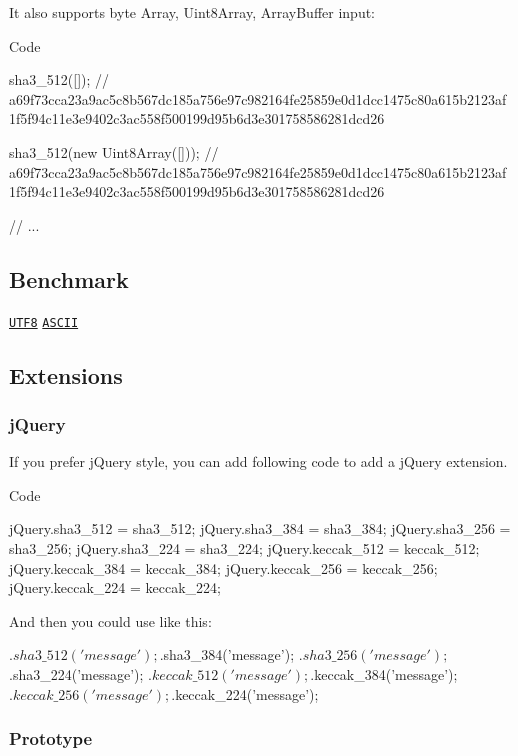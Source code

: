 It also supports byte {\ttfamily Array}, {\ttfamily Uint8\+Array}, {\ttfamily Array\+Buffer} input\+:

Code 
\begin{DoxyCode}
sha3\_512([]);
//
       a69f73cca23a9ac5c8b567dc185a756e97c982164fe25859e0d1dcc1475c80a615b2123af1f5f94c11e3e9402c3ac558f500199d95b6d3e301758586281dcd26

sha3\_512(new Uint8Array([]));
//
       a69f73cca23a9ac5c8b567dc185a756e97c982164fe25859e0d1dcc1475c80a615b2123af1f5f94c11e3e9402c3ac558f500199d95b6d3e301758586281dcd26

// ...
\end{DoxyCode}


\subsection*{Benchmark}

\href{http://jsperf.com/sha3/5}{\tt U\+T\+F8} \href{http://jsperf.com/sha3/4}{\tt A\+S\+C\+II}

\subsection*{Extensions}

\subsubsection*{j\+Query}

If you prefer j\+Query style, you can add following code to add a j\+Query extension.

Code 
\begin{DoxyCode}
jQuery.sha3\_512 = sha3\_512;
jQuery.sha3\_384 = sha3\_384;
jQuery.sha3\_256 = sha3\_256;
jQuery.sha3\_224 = sha3\_224;
jQuery.keccak\_512 = keccak\_512;
jQuery.keccak\_384 = keccak\_384;
jQuery.keccak\_256 = keccak\_256;
jQuery.keccak\_224 = keccak\_224;
\end{DoxyCode}
 And then you could use like this\+: 
\begin{DoxyCode}
$.sha3\_512('message');
$.sha3\_384('message');
$.sha3\_256('message');
$.sha3\_224('message');
$.keccak\_512('message');
$.keccak\_384('message');
$.keccak\_256('message');
$.keccak\_224('message');
\end{DoxyCode}
 \subsubsection*{Prototype}

